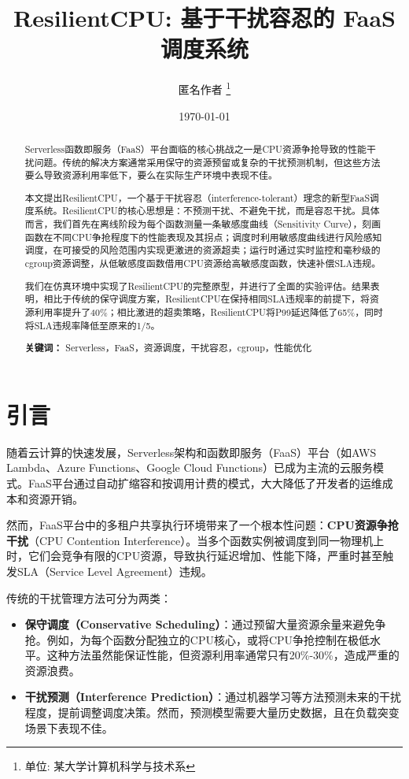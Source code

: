 \documentclass[11pt, a4paper, oneside]{article}
\title{ResilientCPU: 基于干扰容忍的 FaaS 调度系统}
\author{
    匿名作者
    \footnote{单位: 某大学计算机科学与技术系}
}
\date{\today}
\begin{document}
\maketitle

\begin{abstract}
Serverless函数即服务（FaaS）平台面临的核心挑战之一是CPU资源争抢导致的性能干扰问题。传统的解决方案通常采用保守的资源预留或复杂的干扰预测机制，但这些方法要么导致资源利用率低下，要么在实际生产环境中表现不佳。

本文提出ResilientCPU，一个基于干扰容忍（interference-tolerant）理念的新型FaaS调度系统。ResilientCPU的核心思想是：不预测干扰、不避免干扰，而是容忍干扰。具体而言，我们首先在离线阶段为每个函数测量一条敏感度曲线（Sensitivity Curve），刻画函数在不同CPU争抢程度下的性能表现及其拐点；调度时利用敏感度曲线进行风险感知调度，在可接受的风险范围内实现更激进的资源超卖；运行时通过实时监控和毫秒级的cgroup资源调整，从低敏感度函数借用CPU资源给高敏感度函数，快速补偿SLA违规。

我们在仿真环境中实现了ResilientCPU的完整原型，并进行了全面的实验评估。结果表明，相比于传统的保守调度方案，ResilientCPU在保持相同SLA违规率的前提下，将资源利用率提升了40\%；相比激进的超卖策略，ResilientCPU将P99延迟降低了65\%，同时将SLA违规率降低至原来的1/5。

\textbf{关键词：} Serverless，FaaS，资源调度，干扰容忍，cgroup，性能优化
\end{abstract}

\section{引言}

随着云计算的快速发展，Serverless架构和函数即服务（FaaS）平台（如AWS Lambda、Azure Functions、Google Cloud Functions）已成为主流的云服务模式。FaaS平台通过自动扩缩容和按调用计费的模式，大大降低了开发者的运维成本和资源开销。

然而，FaaS平台中的多租户共享执行环境带来了一个根本性问题：\textbf{CPU资源争抢干扰}（CPU Contention Interference）\citep{dai2019hyperion,jiang2019nocontention}。当多个函数实例被调度到同一物理机上时，它们会竞争有限的CPU资源，导致执行延迟增加、性能下降，严重时甚至触发SLA（Service Level Agreement）违规。

传统的干扰管理方法可分为两类：

\begin{itemize}
    \item \textbf{保守调度（Conservative Scheduling）}：通过预留大量资源余量来避免争抢。例如，为每个函数分配独立的CPU核心，或将CPU争抢控制在极低水平。这种方法虽然能保证性能，但资源利用率通常只有20\%-30\%，造成严重的资源浪费。

    \item \textbf{干扰预测（Interference Prediction）}：通过机器学习等方法预测未来的干扰程度，提前调整调度决策\citep{zhang2020prediction,shen2019interference}。然而，预测模型需要大量历史数据，且在负载突变场景下表现不佳。
\end{itemize}
\end{document}
